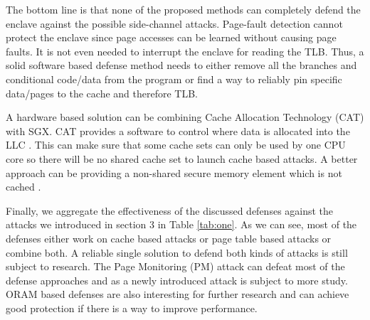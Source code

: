 The bottom line is that none of the proposed methods can completely defend the enclave against the possible side-channel attacks. Page-fault detection cannot protect the enclave since page accesses can be learned without causing page faults. It is not even needed to interrupt the enclave for reading the TLB. Thus, a solid software based defense method needs to either remove all the branches and conditional code/data from the program or find a way to reliably pin specific data/pages to the cache and therefore TLB.

A hardware based solution can be combining Cache Allocation Technology (CAT) with SGX. CAT provides a software to control where data is allocated into the LLC \cite{cat}. This can make sure that some cache sets can only be used by one CPU core so there will be no shared cache set to launch cache based attacks. A better approach can be providing a non-shared secure memory element which is not cached \cite{mge}.

Finally, we aggregate the effectiveness of the discussed defenses against the attacks we introduced in section 3 in Table \ref{tab:one}. As we can see, most of the defenses either work on cache based attacks or page table based attacks or combine both. A reliable single solution to defend both kinds of attacks is still subject to research. The Page Monitoring (PM) attack can defeat most of the defense approaches and as a newly introduced attack is subject to more study. ORAM based defenses are also interesting for further research and can achieve good protection if there is a way to improve performance.

